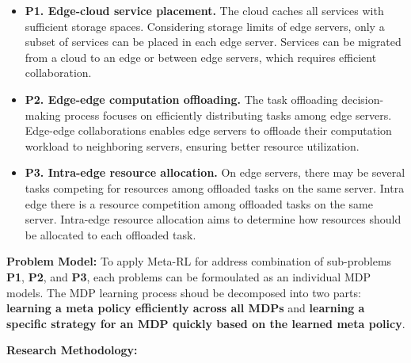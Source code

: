 \documentclass[12pt]{article}
\begin{document}
\begin{itemize}
	
	\item \textbf{P1. Edge-cloud service placement. } %
	The cloud caches all services with sufficient storage spaces. Considering storage limits of edge servers, only a subset of services can be placed in each edge server. Services can be migrated from a cloud to an edge or between edge servers, which requires efficient collaboration.\vspace{-2mm}
	
	\item\textbf{P2. Edge-edge computation offloading. }  The task offloading decision-making process focuses on efficiently distributing tasks among edge servers. Edge-edge collaborations enables edge servers to offloade their computation workload to neighboring servers, ensuring better resource utilization. \vspace{-2mm}
	
	\item\textbf{P3. Intra-edge resource allocation. } On edge servers, there may be several tasks competing for resources among offloaded tasks on the same server. Intra edge there is a resource competition among offloaded tasks on the same server. Intra-edge resource allocation aims to determine how resources should be allocated to each offloaded task.
	
\end{itemize}

\vspace{0mm}

\noindent\textbf{\large Problem Model: } To apply Meta-RL for address combination of sub-problems  \textbf{P1},  \textbf{P2}, and \textbf{P3}, each problems can be formoulated as an individual MDP models. The MDP learning process shoud be decomposed into two parts: \textbf{learning a meta policy efficiently across all MDPs} and \textbf{learning a specific strategy for an MDP quickly based on the learned meta policy}.
\noindent

\vspace{5mm}

\noindent\textbf{\large Research Methodology:}
\end{document}

